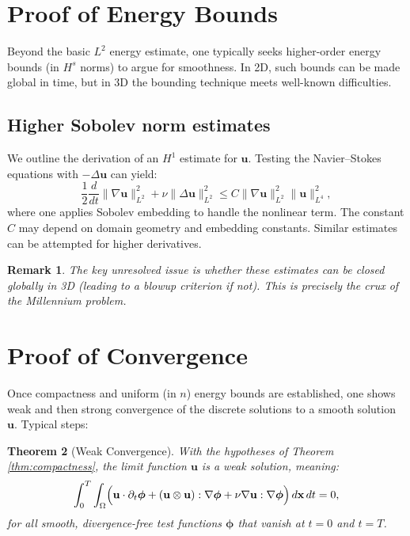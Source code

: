 \documentclass[11pt]{article}
\newtheorem{theorem}{Theorem}[section]
\newtheorem{remark}[theorem]{Remark}
\numberwithin{equation}{section}
\begin{document}
\section{Proof of Energy Bounds}\label{sec:energy_bounds}

Beyond the basic \(L^2\) energy estimate, one typically seeks higher-order energy
bounds (in \(H^s\) norms) to argue for smoothness. In 2D, such bounds can be made
global in time, but in 3D the bounding technique meets well-known difficulties.

\subsection{Higher Sobolev norm estimates}

We outline the derivation of an \(H^1\) estimate for \(\mathbf{u}\). Testing the
Navier--Stokes equations with \(-\Delta \mathbf{u}\) can yield:
\[
\frac{1}{2}\frac{d}{dt} \|\nabla \mathbf{u}\|_{L^2}^2 + \nu \|\Delta \mathbf{u}\|_{L^2}^2
  \le C \|\nabla \mathbf{u}\|_{L^2}^2 \|\mathbf{u}\|_{L^4}^2,
\]
where one applies Sobolev embedding to handle the nonlinear term. The constant \(C\)
may depend on domain geometry and embedding constants. Similar estimates can be
attempted for higher derivatives.

\begin{remark}
The key unresolved issue is whether these estimates can be closed globally in 3D
(leading to a blowup criterion if not). This is precisely the crux
of the Millennium problem.
\end{remark}

\section{Proof of Convergence}\label{sec:conv_proof}

Once compactness and uniform (in \(n\)) energy bounds are established, one shows
weak and then strong convergence of the discrete solutions to a smooth solution
\(\mathbf{u}\). Typical steps:

\begin{theorem}[Weak Convergence]
With the hypotheses of Theorem \ref{thm:compactness}, the limit function \(\mathbf{u}\)
is a \emph{weak solution}, meaning:
\[
\int_0^T \int_\Omega \Bigl(
  \mathbf{u}\cdot \partial_t \boldsymbol{\phi}
  + (\mathbf{u} \otimes \mathbf{u}): \nabla \boldsymbol{\phi}
  + \nu \nabla \mathbf{u} : \nabla \boldsymbol{\phi}
\Bigr) \, d\mathbf{x}\, dt = 0,
\]
for all smooth, divergence-free test functions \(\boldsymbol{\phi}\) that vanish at \(t=0\)
and \(t=T\).
\end{theorem}
\end{document}
